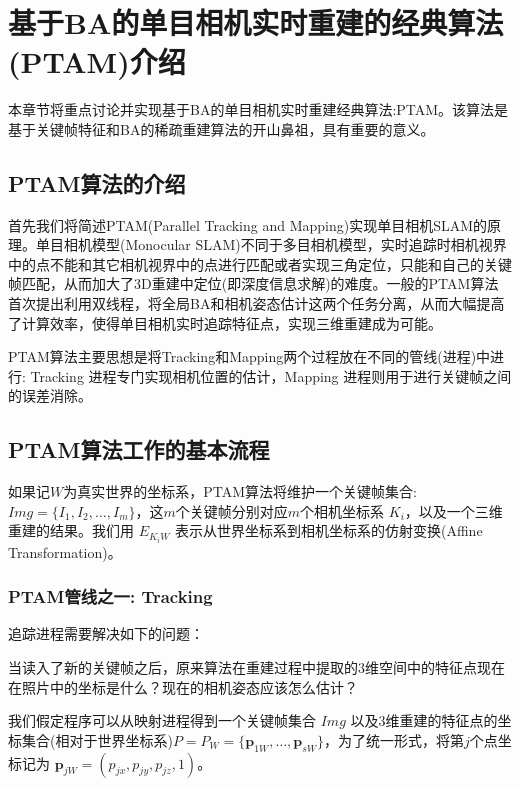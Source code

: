 
\def \R2{\mathbb{R}^2}
\def \R3{\mathbb{R}^3}
\def \Rn{\mathbb{R}^n}

\def \itW{\mathit{W}}

\def \itK{\mathit{K}}
\def \bfp{\mathbf{p}}

\chapter{基于BA的单目相机实时重建的经典算法(PTAM)介绍}

本章节将重点讨论并实现基于BA的单目相机实时重建经典算法:PTAM。该算法是基于关键帧特征和BA的稀疏重建算法的开山鼻祖，具有重要的意义。

\section{PTAM算法的介绍}
首先我们将简述PTAM\cite{Klein2007}(Parallel Tracking and Mapping)实现单目相机SLAM的原理。单目相机模型(Monocular SLAM)不同于多目相机模型，实时追踪时相机视界中的点不能和其它相机视界中的点进行匹配或者实现三角定位，只能和自己的关键帧匹配，从而加大了3D重建中定位(即深度信息求解)的难度。一般的PTAM算法首次提出利用双线程，将全局BA和相机姿态估计这两个任务分离，从而大幅提高了计算效率，使得单目相机实时追踪特征点，实现三维重建成为可能。

PTAM算法主要思想是将Tracking和Mapping两个过程放在不同的管线(进程)中进行: Tracking 进程专门实现相机位置的估计，Mapping 进程则用于进行关键帧之间的误差消除。

\section{PTAM算法工作的基本流程}
如果记$\itW$为真实世界的坐标系，PTAM算法将维护一个关键帧集合: $Img=\{I_1,I_2,\ldots,I_m\}$，这\(m\)个关键帧分别对应\(m\)个相机坐标系 $\itK_i$，以及一个三维重建的结果。我们用 $E_{\itK_i\itW}$ 表示从世界坐标系到相机坐标系的仿射变换(Affine Transformation)。


\subsection{PTAM管线之一: Tracking}


追踪进程需要解决如下的问题：

当读入了新的关键帧之后，原来算法在重建过程中提取的3维空间中的特征点现在在照片中的坐标是什么？现在的相机姿态应该怎么估计？ 

我们假定程序可以从映射进程得到一个关键帧集合 $Img$ 以及3维重建的特征点的坐标集合(相对于世界坐标系)$P=P_\itW=\{\bfp_{1\itW},\ldots,\bfp_{s\itW}\}$，为了统一形式，将第$j$个点坐标记为 $\bfp_{j\itW}= (p_{jx},p_{jy},p_{jz},1)$。

